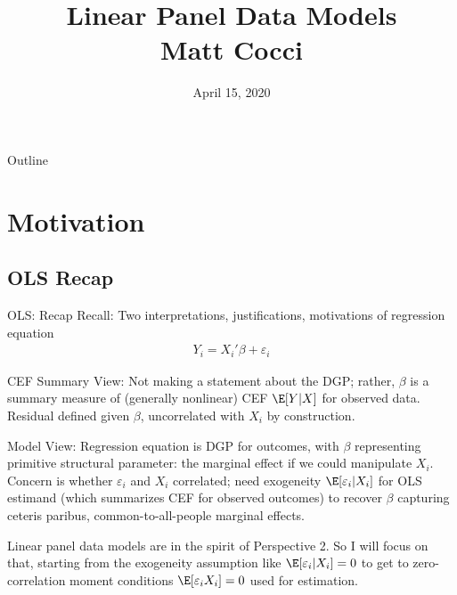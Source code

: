\documentclass[aspectratio=169, handout]{beamer}
\title[]{Linear Panel Data Models \\ Matt Cocci}
\author[]{}
\date{April 15, 2020}
\begin{document}
\begin{frame}[plain]
\titlepage
\end{frame}


\begin{frame}{Outline}
\tableofcontents[hideallsubsections]
\end{frame}


\section{Motivation}


\subsection{OLS Recap}

{\footnotesize
\begin{frame}{OLS: Recap}
\alert{Recall}:
Two interpretations, justifications, motivations of regression equation
\vspace{-5pt}
\begin{align*}
  Y_i
  =
  X_i'\beta
  +
  \varepsilon_i
\end{align*}
\vspace{-25pt}
\pause
\begin{enumerate}
  {\footnotesize
  \item \alert{CEF Summary View}:
    Not making a statement about the DGP; rather, $\beta$ is a summary
    measure of (generally nonlinear) CEF $\E[Y|X]$ for observed data.
    Residual defined given $\beta$, uncorrelated with $X_i$ by
    construction.

  \item \alert{Model View}:
    Regression equation is DGP for outcomes, with $\beta$ representing
    primitive structural parameter: the marginal effect if we could
    manipulate $X_i$.
    Concern is whether $\varepsilon_i$ and $X_i$ correlated;
    need exogeneity $\E[\varepsilon_i|X_i]$ for
    OLS estimand (which summarizes CEF for observed outcomes) to recover
    $\beta$ capturing ceteris paribus, common-to-all-people marginal
    effects.
  }
\end{enumerate}
\pause
Linear panel data models are in the spirit of Perspective 2.
So I will focus on that, starting from the exogeneity assumption
like $\E[\varepsilon_i|X_i]=0$ to get to zero-correlation moment
conditions
$\E[\varepsilon_iX_i]=0$
used for estimation.
\end{frame}
}
\end{document}

